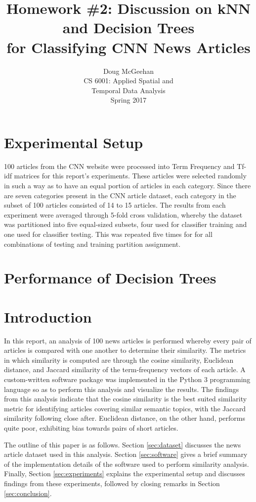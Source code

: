 \documentclass[11pt]{article}
\title{Homework \#2: Discussion on kNN and Decision Trees\\ for Classifying CNN News Articles}
\author{Doug McGeehan\\
		CS 6001: Applied Spatial and \\ Temporal Data Analysis\\
		Spring 2017}
\begin{document}
\maketitle

\section{Experimental Setup}

100 articles from the CNN website were processed into Term Frequency and Tf-idf matrices for this report's experiments.
These articles were selected randomly in such a way as to have an equal portion of articles in each category.
Since there are seven categories present in the CNN article dataset, each category in the subset of 100 articles consisted of 14 to 15 articles.
The results from each experiment were averaged through 5-fold cross validation,
 whereby the dataset was partitioned into five equal-sized subsets, four used for classifier training and one used for classifier testing.
This was repeated five times for for all combinations of testing and training partition assignment.

\section{Performance of Decision Trees}



\section{Introduction}

In this report, an analysis of 100 news articles is performed whereby every pair of articles is compared with one another to determine their similarity.
The metrics in which similarity is computed are through the cosine similarity, Euclidean distance, and Jaccard similarity of the term-frequency vectors of each article.
A custom-written software package was implemented in the Python 3 programming language so as to perform this analysis and visualize the results.
The findings from this analysis indicate that the cosine similarity is the best suited similarity metric for identifying articles covering similar semantic topics, with the Jaccard similarity following close after.
Euclidean distance, on the other hand, performs quite poor, exhibiting bias towards pairs of short articles.

The outline of this paper is as follows.
Section \ref{sec:dataset} discusses the news article dataset used in this analysis.
Section \ref{sec:software} gives a brief summary of the implementation details of the software used to perform similarity analysis.
Finally, Section \ref{sec:experiments} explains the experimental setup and discusses findings from these experiments, followed by closing remarks in Section \ref{sec:conclusion}.
\end{document}
